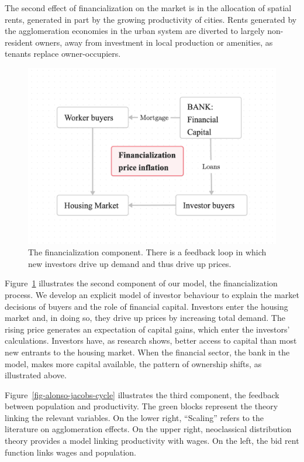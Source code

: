 The second effect of financialization on the market is in the allocation of spatial rents, generated in part by the growing productivity of cities. Rents generated by the \gls{agglomeration} economies in the urban system are diverted to largely non-resident owners, away from investment in local production or amenities, as tenants replace owner-occupiers.

\begin{figure}[!ht]
\centering
\includegraphics[scale=.20]{fig/flow-financialization.png}
\caption[The financialization component of the model]{The financialization component. There is a feedback loop in which new investors drive up demand and thus drive up prices.}
\label{fig-financial-cycle}
\end{figure}

Figure~\ref{fig-financial-cycle} illustrates the second component of our model, the financialization process. We develop an explicit model of investor behaviour to explain the market decisions of buyers and the role of financial capital. %
Investors enter the housing market and, in doing so, they drive up prices by increasing total demand. The rising price generates an expectation of capital gains, which enter the investors' calculations. Investors have, as research shows, better access to capital than most new entrants to the housing market. When the financial sector, the bank in the model, makes more capital available, the pattern of ownership shifts, as illustrated above.

Figure~\ref{fig-alonso-jacobs-cycle} illustrates the third component, the feedback between population and productivity. The green blocks represent the theory linking the relevant variables.  On the lower right, ``Scaling'' refers to the literature on agglomeration effects. On the upper right, neoclassical distribution theory provides a model linking productivity with wages.  On the left, the bid rent function links wages and population.


